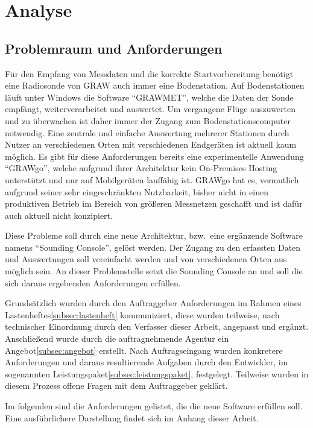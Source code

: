\section{Analyse}

\subsection{Problemraum und Anforderungen}
Für den Empfang von Messdaten und die korrekte Startvorbereitung benötigt eine Radiosonde von GRAW auch immer eine Bodenstation.
Auf Bodenstationen läuft unter Windows die Software \enquote{GRAWMET}\cite{grawmet}, welche die Daten der Sonde empfängt, weiterverarbeitet und auswertet.
Um vergangene Flüge auszuwerten und zu überwachen ist daher immer der Zugang zum Bodenstationscomputer notwendig.
Eine zentrale und einfache Auswertung mehrerer Stationen durch Nutzer an verschiedenen Orten mit verschiedenen Endgeräten ist aktuell kaum möglich.
Es gibt für diese Anforderungen bereits eine experimentelle Anwendung \enquote{GRAWgo}\cite{grawgo}, welche aufgrund ihrer Architektur kein On-Premises Hosting unterstützt und nur auf Mobilgeräten lauffähig ist.
GRAWgo hat es, vermutlich aufgrund seiner sehr eingeschränkten Nutzbarkeit, bisher nicht in einen produktiven Betrieb im Bereich von größeren Messnetzen geschafft und ist dafür auch aktuell nicht konzipiert.

Diese Probleme soll durch eine neue Architektur, bzw.\ eine ergänzende Software namens \enquote{Sounding Console}, gelöst werden.
Der Zugang zu den erfassten Daten und Auswertungen soll vereinfacht werden und von verschiedenen Orten aus möglich sein.
An dieser Problemstelle setzt die Sounding Console an und soll die sich daraus ergebenden Anforderungen erfüllen.

Grundsätzlich wurden durch den Auftraggeber Anforderungen im Rahmen eines Lastenheftes\ref{subsec:lastenheft} kommuniziert, diese wurden teilweise, nach technischer Einordnung durch den Verfasser dieser Arbeit, angepasst und ergänzt.
Anschließend wurde durch die auftragnehmende Agentur ein Angebot\ref{subsec:angebot} erstellt.
Nach Auftragseingang wurden konkretere Anforderungen und daraus resultierende Aufgaben durch den Entwickler, im sogenannten Leistungspaket\ref{subsec:leistungspaket}, festgelegt.
Teilweise wurden in diesem Prozess offene Fragen mit dem Auftraggeber geklärt.

Im folgenden sind die Anforderungen gelistet, die die neue Software erfüllen soll.
Eine ausführlichere Darstellung findet sich im Anhang dieser Arbeit.
\newpage

